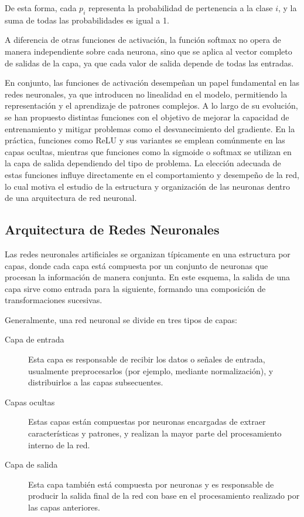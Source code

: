 De esta forma, cada $p_i$ representa la probabilidad de pertenencia a la clase $i$, y la suma
de todas las probabilidades es igual a 1.
\medskip

A diferencia de otras funciones de activación, la función softmax no opera de manera
independiente sobre cada neurona, sino que se aplica al vector completo de salidas de
la capa, ya que cada valor de salida depende de todas las entradas.
\medskip

En conjunto, las funciones de activación desempeñan un papel fundamental en las redes neuronales,
ya que introducen no linealidad en el modelo, permitiendo la representación y el aprendizaje de
patrones complejos. A lo largo de su evolución, se han propuesto distintas funciones con el objetivo
de mejorar la capacidad de entrenamiento y mitigar problemas como el desvanecimiento del gradiente.
En la práctica, funciones como ReLU y sus variantes se emplean comúnmente en las capas ocultas,
mientras que funciones como la sigmoide o softmax se utilizan en la capa de salida dependiendo del
tipo de problema. La elección adecuada de estas funciones influye directamente en el comportamiento
y desempeño de la red, lo cual motiva el estudio de la estructura y organización de las neuronas
dentro de una arquitectura de red neuronal.

\subsection{Arquitectura de Redes Neuronales}
Las redes neuronales artificiales se organizan típicamente en una estructura por capas,
donde cada capa está compuesta por un conjunto de neuronas que procesan la información
de manera conjunta. En este esquema, la salida de una capa sirve como entrada para la
siguiente, formando una composición de transformaciones sucesivas.
\medskip

Generalmente, una red neuronal se divide en tres tipos de capas:
\begin{description}
    \item[Capa de entrada] Esta capa es responsable de recibir los datos o señales de entrada,
    usualmente preprocesarlos (por ejemplo, mediante normalización), y distribuirlos a las
    capas subsecuentes.
    
    \item[Capas ocultas] Estas capas están compuestas por neuronas encargadas de extraer
    características y patrones, y realizan la mayor parte del procesamiento interno de la red.
    
    \item[Capa de salida] Esta capa también está compuesta por neuronas y es responsable
    de producir la salida final de la red con base en el procesamiento realizado por las
    capas anteriores.
\end{description}
\medskip

